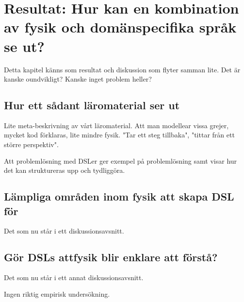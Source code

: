 
\chapter{Resultat: Hur kan en kombination av fysik och domänspecifika språk se ut?}
\begin{binge}

Detta kapitel känns som resultat och diskussion som flyter samman lite. Det är kanske oundvikligt? Kanske inget problem heller?

\section{Hur ett sådant läromaterial ser ut}

Lite meta-beskrivning av vårt läromaterial. Att man modellear vissa grejer, mycket kod förklaras, lite mindre fysik. "Tar ett steg tillbaka", "tittar från ett större perspektiv".

Att problemlösning med DSLer ger exempel på problemlösning samt visar hur det kan struktureras upp och tydliggöra.

\section{Lämpliga områden inom fysik att skapa DSL för}

Det som nu står i ett diskussionsavsnitt.

\section{Gör DSLs attfysik blir enklare att förstå?}

Det som nu står i ett annat diskussionsavsnitt.

Ingen riktig empirisk undersökning.

\end{binge}
